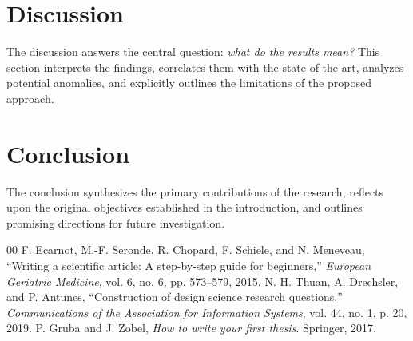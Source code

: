 \documentclass[10pt,twocolumn,a4paper]{article}
\begin{document}
\section{Discussion}
The discussion answers the central question: \textit{what do the results mean?} This section interprets the findings, correlates them with the state of the art, analyzes potential anomalies, and explicitly outlines the limitations of the proposed approach.

\section{Conclusion}
The conclusion synthesizes the primary contributions of the research, reflects upon the original objectives established in the introduction, and outlines promising directions for future investigation.

\begin{thebibliography}{00}
 F. Ecarnot, M.-F. Seronde, R. Chopard, F. Schiele, and N. Meneveau, ``Writing a scientific article: A step-by-step guide for beginners,'' \textit{European Geriatric Medicine}, vol. 6, no. 6, pp. 573--579, 2015.
 N. H. Thuan, A. Drechsler, and P. Antunes, ``Construction of design science research questions,'' \textit{Communications of the Association for Information Systems}, vol. 44, no. 1, p. 20, 2019.
 P. Gruba and J. Zobel, \textit{How to write your first thesis}. Springer, 2017.
\end{thebibliography}
\end{document}
